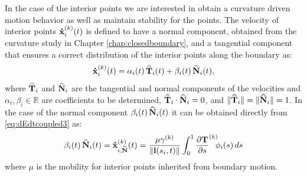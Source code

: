 In the case of the interior points we are interested in obtain a curvature driven motion behavior as well as maintain stability for the points. The velocity of interior points $\dotx[i][k](t)$ is defined to have a normal component, obtained from the curvature study in Chapter \ref{chap:closedboundary}, and a tangential component that ensures a correct distribution of the interior points along the boundary as:
\begin{equation}
\dotx[i][k](t) = \alpha_i(t)\,\hatT_i(t) + \beta_i(t)\,\hatN_i(t),
\label{eq:ortho_decomp}
\end{equation}
where $\widehat{\mathbf{T}}_i$ and $\widehat{\mathbf{N}}_i$ are the tangential and normal components of the velocities and $\alpha_i, \beta_i \in \mathbb{R}$ are coefficients to be determined, $\widehat{\mathbf{T}}_i\cdot \widehat{\mathbf{N}}_i=0$, and $\|\widehat{\mathbf{T}}_i\|=\|\widehat{\mathbf{N}}_i\|=1$.
In the case of the normal component $\beta_i(t)\,\widehat{\mathbf{N}}_i(t)$ it can be obtained directly from \eqref{eq:dEdtcoupled3} as:
\begin{align}
    \beta_i(t)\,\hatN_i(t) = \dotx[i,\hatN][k](t)  = \frac{\mu\gamma^{(k)}}{\norm{\mylvec(s_i,t)}} \int_0^1 \dTds^{(k)}\!\!\phi_i(s)\,ds 
    \label{eq:interiorpointsvel}
\end{align}
where $\mu$ is the mobility for interior points inherited from boundary motion.

